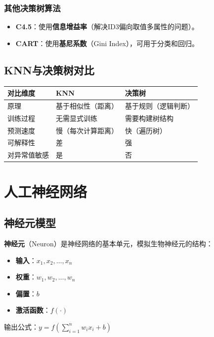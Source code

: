 \subsubsection{其他决策树算法}
\begin{itemize}[leftmargin=2em,itemsep=0pt]
    \item \textbf{C4.5}：使用\textbf{信息增益率}（解决ID3偏向取值多属性的问题）。
    \item \textbf{CART}：使用\textbf{基尼系数}（Gini Index），可用于分类和回归。
\end{itemize}



\subsection{KNN与决策树对比}

\begin{table}[htbp]
\centering\small
\begin{tabular}{lll}
\toprule
\textbf{对比维度} & \textbf{KNN} & \textbf{决策树} \\
\midrule
原理 & 基于相似性（距离） & 基于规则（逻辑判断） \\
训练过程 & 无需显式训练 & 需要构建树结构 \\
预测速度 & 慢（每次计算距离） & 快（遍历树） \\
可解释性 & 差 & 强 \\
对异常值敏感 & 是 & 否 \\
\bottomrule
\end{tabular}
\end{table}



\section{人工神经网络}

\subsection{神经元模型}

\begin{conceptbox}
\textbf{神经元}（Neuron）是神经网络的基本单元，模拟生物神经元的结构：
\begin{itemize}[leftmargin=2em,itemsep=0pt]
    \item \textbf{输入}：$x_1, x_2, \dots, x_n$
    \item \textbf{权重}：$w_1, w_2, \dots, w_n$
    \item \textbf{偏置}：$b$
    \item \textbf{激活函数}：$f(\cdot)$
\end{itemize}
输出公式：$y = f(\sum_{i=1}^{n} w_i x_i + b)$
\end{conceptbox}

